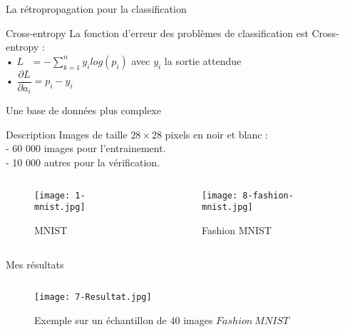 \begin{frame}{La rétropropagation pour la classification}
	\begin{block}{Cross-entropy}
		La fonction d'erreur des problèmes de classification est Cross-entropy : \\
		• $L\ \ \ = -\sum_{k=1}^{n}y_ilog(p_i)$ avec $y_i$ la sortie attendue \\
		• $\dfrac{\partial L}{\partial a_i} = p_i - y_i$
	\end{block}
\end{frame}



\begin{frame}{Une base de données plus complexe}
    \begin{block}{Description}
        Images de taille $28 \times 28$ pixels en noir et blanc : \\
        \quad - 60 000 images pour l'entrainement. \\
        \quad - 10 000 autres pour la vérification.
    \end{block}
    \begin{columns}
        \begin{column}{0.5\textwidth}
            \begin{figure}
                \centering
                \texttt{[image: 1-mnist.jpg]}
                \caption{MNIST}
            \end{figure}
        \end{column}
        \begin{column}{0.5\textwidth}
            \begin{figure}
                \centering
                \texttt{[image: 8-fashion-mnist.jpg]}
                \caption{Fashion MNIST}
            \end{figure}
        \end{column}
    \end{columns}
\end{frame}


\begin{frame}{Mes résultats}
    \begin{columns}[T]
        \begin{column}{.75\textwidth}
            \begin{figure}
                \centering
                \texttt{[image: 7-Resultat.jpg]}
                \caption{Exemple sur un échantillon de 40 images $Fashion\ MNIST$}
            \end{figure}
        \end{column}
        \hfill
        \begin{column}{.25\textwidth}
            \bigskip	\bigskip	\bigskip
            
        \end{column}
    \end{columns}
\end{frame}



